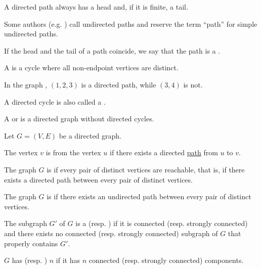\begin{definition}
\begin{thmenum}
    A directed path always has a head and, if it is finite, a tail.

    Some authors (e.g. \cite[sec. 5.2]{Erickson2019}) call undirected paths  and reserve the term \enquote{path} for simple undirected paths.

    If the head and the tail of a path coincide, we say that the path is a .

    A  is a cycle where all non-endpoint vertices are distinct.


    In the graph , \( (1, 2, 3) \) is a directed path, while \( (3, 4) \) is not.

    A directed cycle is also called a .

    A  or  is a directed graph without directed cycles.
  \end{thmenum}
\end{definition}

\begin{definition}\label{def:graph_connectedness}
  Let \( G = (V, E) \) be a directed graph.

  \begin{thmenum}
    The vertex \( v \) is  from the vertex \( u \) if there exists a directed \hyperref[def:graph_paths/directed_path]{path} from \( u \) to \( v \).

    The graph \( G \) is  if every pair of distinct vertices are reachable, that is, if there exists a directed path between every pair of distinct vertices.

    The graph \( G \) is  if there exists an undirected path between every pair of distinct vertices.

    The subgraph \( G' \) of \( G \) is a  (resp. ) if it is connected (resp. strongly connected) and there exists no connected (resp. strongly connected) subgraph of \( G \) that properly contains \( G' \).

    \( G \) has  (resp. ) \( n \) if it has \( n \) connected (resp. strongly connected) components.
  \end{thmenum}
\end{definition}

